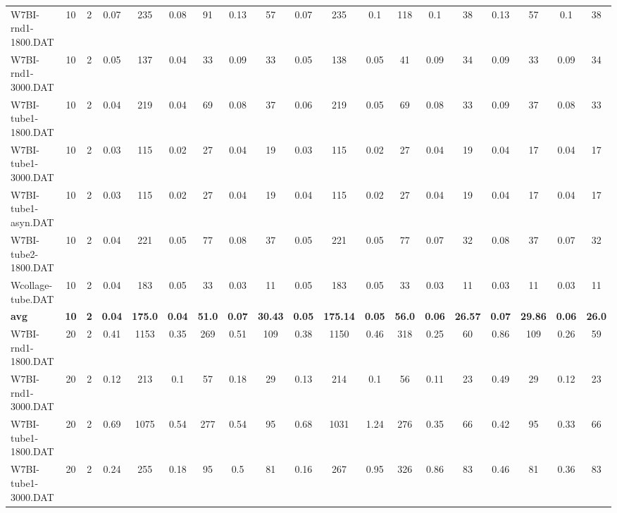 \begin{sidewaystable}[!ht]
{\begin{tabular}{lcccccccccccccccccc}
W7BI-rnd1-1800.DAT & 10 & 2 &  \textcolor{blue2}{0.07} & 235 & 0.08 & 91 & 0.13 & 57 &  \textcolor{blue2}{0.07} & 235 & 0.1 & 118 & 0.1 & 38 & 0.13 & 57 & 0.1 & 38 \\
W7BI-rnd1-3000.DAT & 10 & 2 & 0.05 & 137 &  \textcolor{blue2}{0.04} & 33 & 0.09 & 33 & 0.05 & 138 & 0.05 & 41 & 0.09 & 34 & 0.09 & 33 & 0.09 & 34 \\
W7BI-tube1-1800.DAT & 10 & 2 &  \textcolor{blue2}{0.04} & 219 &  \textcolor{blue2}{0.04} & 69 & 0.08 & 37 & 0.06 & 219 & 0.05 & 69 & 0.08 & 33 & 0.09 & 37 & 0.08 & 33 \\
W7BI-tube1-3000.DAT & 10 & 2 & 0.03 & 115 &  \textcolor{blue2}{0.02} & 27 & 0.04 & 19 & 0.03 & 115 &  \textcolor{blue2}{0.02} & 27 & 0.04 & 19 & 0.04 & 17 & 0.04 & 17 \\
W7BI-tube1-asyn.DAT & 10 & 2 & 0.03 & 115 &  \textcolor{blue2}{0.02} & 27 & 0.04 & 19 & 0.04 & 115 &  \textcolor{blue2}{0.02} & 27 & 0.04 & 19 & 0.04 & 17 & 0.04 & 17 \\
W7BI-tube2-1800.DAT & 10 & 2 &  \textcolor{blue2}{0.04} & 221 & 0.05 & 77 & 0.08 & 37 & 0.05 & 221 & 0.05 & 77 & 0.07 & 32 & 0.08 & 37 & 0.07 & 32 \\
Wcollage-tube.DAT & 10 & 2 & 0.04 & 183 & 0.05 & 33 &  \textcolor{blue2}{0.03} & 11 & 0.05 & 183 & 0.05 & 33 &  \textcolor{blue2}{0.03} & 11 &  \textcolor{blue2}{0.03} & 11 &  \textcolor{blue2}{0.03} & 11 \\
\cline{1-19} \textbf{avg} & \textbf{10} & \textbf{2} & \textbf{0.04} & \textbf{175.0} & \textbf{0.04} & \textbf{51.0} & \textbf{0.07} & \textbf{30.43} & \textbf{0.05} & \textbf{175.14} & \textbf{0.05} & \textbf{56.0} & \textbf{0.06} & \textbf{26.57} & \textbf{0.07} & \textbf{29.86} & \textbf{0.06} & \textbf{26.0} \\ \cline{1-19}
W7BI-rnd1-1800.DAT & 20 & 2 & 0.41 & 1153 & 0.35 & 269 & 0.51 & 109 & 0.38 & 1150 & 0.46 & 318 &  \textcolor{blue2}{0.25} & 60 & 0.86 & 109 & 0.26 & 59 \\
W7BI-rnd1-3000.DAT & 20 & 2 & 0.12 & 213 &  \textcolor{blue2}{0.1} & 57 & 0.18 & 29 & 0.13 & 214 &  \textcolor{blue2}{0.1} & 56 & 0.11 & 23 & 0.49 & 29 & 0.12 & 23 \\
W7BI-tube1-1800.DAT & 20 & 2 & 0.69 & 1075 & 0.54 & 277 & 0.54 & 95 & 0.68 & 1031 & 1.24 & 276 & 0.35 & 66 & 0.42 & 95 &  \textcolor{blue2}{0.33} & 66 \\
W7BI-tube1-3000.DAT & 20 & 2 & 0.24 & 255 & 0.18 & 95 & 0.5 & 81 &  \textcolor{blue2}{0.16} & 267 & 0.95 & 326 & 0.86 & 83 & 0.46 & 81 & 0.36 & 83 \\

\end{tabular}}
\end{sidewaystable}
